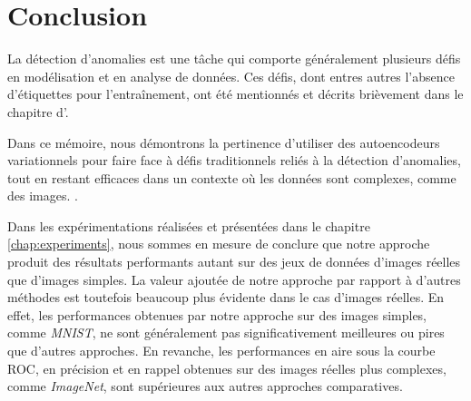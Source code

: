 \chapter*{Conclusion}           %
\label{chap:conclusion}         %

La détection d'anomalies est une tâche qui comporte généralement plusieurs défis en modélisation et en analyse de données. Ces défis, dont entres autres l'absence d'étiquettes pour l'entraînement, ont été mentionnés et décrits brièvement dans le chapitre d'. \DIFaddbegin {}

\DIFaddend Dans ce mémoire, nous démontrons la pertinence d'utiliser des autoencodeurs variationnels pour faire face à \DIFdelbegin {}\DIFdelend \DIFaddbegin {}\DIFaddend défis traditionnels reliés à la détection d'anomalies, tout en restant efficaces dans un contexte où les données sont complexes, comme des images. \DIFdelbegin {}\DIFdelend \DIFaddbegin {}\DIFaddend .

Dans les expérimentations réalisées et présentées dans le chapitre \ref{chap:experiments}, nous sommes en mesure de conclure que notre approche produit des résultats performants autant sur des jeux de données d'images réelles que d'images simples. La valeur ajoutée de notre approche par rapport à d'autres méthodes est toutefois beaucoup plus évidente dans le cas d'images réelles. En effet, les performances obtenues par notre approche sur des images simples, comme \textit{MNIST}, ne sont généralement pas significativement meilleures ou pires que d'autres approches. En revanche, les performances en aire sous la courbe ROC, en précision et en rappel obtenues sur des images réelles plus complexes, comme \textit{ImageNet}, sont supérieures aux autres approches comparatives. \DIFdelbegin {}\DIFdelend \DIFaddbegin {}


